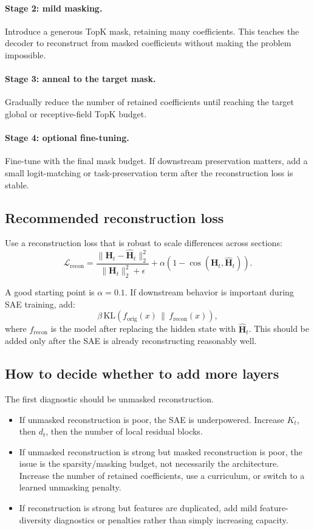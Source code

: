 \documentclass[11pt]{article}
\newcommand{\Htens}{\mathbf{H}}
\newcommand{\Hhat}{\widehat{\mathbf{H}}}
\begin{document}
\paragraph{Stage 2: mild masking.}
Introduce a generous TopK mask, retaining many coefficients. This teaches the decoder to reconstruct from masked coefficients without making the problem impossible.

\paragraph{Stage 3: anneal to the target mask.}
Gradually reduce the number of retained coefficients until reaching the target global or receptive-field TopK budget.

\paragraph{Stage 4: optional fine-tuning.}
Fine-tune with the final mask budget. If downstream preservation matters, add a small logit-matching or task-preservation term after the reconstruction loss is stable.

\subsection{Recommended reconstruction loss}

Use a reconstruction loss that is robust to scale differences across sections:
\[
\mathcal{L}_{\mathrm{recon}}
=
\frac{\|\Htens_t - \Hhat_t\|_2^2}{\|\Htens_t\|_2^2 + \epsilon}
+
\alpha \left(1 - \cos(\Htens_t,\Hhat_t)\right).
\]

A good starting point is \(\alpha=0.1\). If downstream behavior is important during SAE training, add:
\[
\beta\,\mathrm{KL}\left(f_{\mathrm{orig}}(x)\,\|\,f_{\mathrm{recon}}(x)\right),
\]
where \(f_{\mathrm{recon}}\) is the model after replacing the hidden state with \(\Hhat_t\). This should be added only after the SAE is already reconstructing reasonably well.

\subsection{How to decide whether to add more layers}

The first diagnostic should be unmasked reconstruction.

\begin{itemize}[leftmargin=*]
    \item If unmasked reconstruction is poor, the SAE is underpowered. Increase \(K_t\), then \(d_t\), then the number of local residual blocks.
    \item If unmasked reconstruction is strong but masked reconstruction is poor, the issue is the sparsity/masking budget, not necessarily the architecture. Increase the number of retained coefficients, use a curriculum, or switch to a learned unmasking penalty.
    \item If reconstruction is strong but features are duplicated, add mild feature-diversity diagnostics or penalties rather than simply increasing capacity.
\end{itemize}
\end{document}
